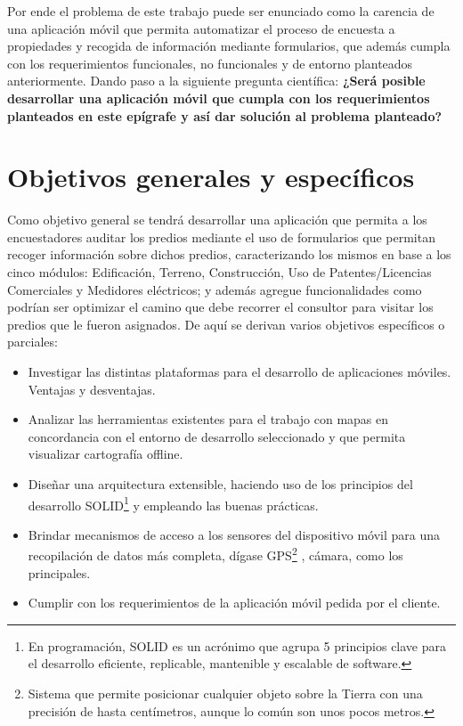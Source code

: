 Por ende el problema de este trabajo puede ser enunciado como la carencia de una
aplicación móvil que permita automatizar el proceso de encuesta a propiedades y
recogida de información mediante formularios, que además cumpla con los
requerimientos funcionales, no funcionales y de entorno planteados anteriormente.
Dando paso a la siguiente pregunta científica:
\textbf{¿Será posible desarrollar una aplicación móvil que cumpla con los requerimientos
      planteados en este epígrafe y así dar solución al problema planteado?}




\section{Objetivos generales y específicos} \label{section:objetivosGeneralesYEspecificos}
Como objetivo general se tendrá desarrollar una aplicación que permita a los
encuestadores auditar los predios mediante el uso de formularios que permitan
recoger información sobre dichos predios, caracterizando los mismos en base a los
cinco módulos: Edificación, Terreno, Construcción, Uso de Patentes/Licencias
Comerciales y Medidores eléctricos; y además agregue funcionalidades como
podrían ser optimizar el camino que debe recorrer el consultor para visitar los
predios que le fueron asignados. De aquí se derivan varios objetivos específicos o
parciales:
\begin{itemize}
      \item Investigar las distintas plataformas para el desarrollo de aplicaciones móviles.
            Ventajas y desventajas.
      \item Analizar las herramientas existentes para el trabajo con mapas en
            concordancia con el entorno de desarrollo seleccionado y que permita
            visualizar cartografía offline.
      \item Diseñar una arquitectura extensible, haciendo uso de los principios del
            desarrollo SOLID\footnote{En programación, SOLID es un acrónimo que agrupa 5 principios clave para el desarrollo eficiente, replicable, mantenible y
                  escalable de software.} y empleando las buenas prácticas.
      \item Brindar mecanismos de acceso a los sensores del dispositivo móvil para una
            recopilación de datos más completa, dígase GPS\footnote{Sistema que permite posicionar cualquier objeto sobre la Tierra con una precisión de hasta
                  centímetros, aunque lo común son unos pocos metros.}
            , cámara, como los principales.
      \item Cumplir con los requerimientos de la aplicación móvil pedida por el
            cliente.
\end{itemize}

